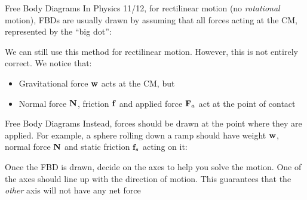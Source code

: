 \documentclass[12pt,compress,aspectratio=169]{beamer}
\newcommand{\mb}[1]{\ensuremath\mathbf{#1}}
\begin{document}
\begin{frame}{Free Body Diagrams}
  In Physics 11/12, for rectilinear motion (no \emph{rotational} motion),
  FBDs are usually drawn by assuming that all forces acting at the CM,
  represented by the ``big dot'':
  \begin{center}
  \end{center}
  \vspace{-.1in}We can still use this method for rectilinear motion. However,
  this is not entirely correct. We notice that:
  \begin{itemize}
  \item Gravitational force $\mb{w}$ acts at the CM, but
  \item Normal force $\mb{N}$, friction $\mb{f}$ and applied force $\mb{F}_a$
    act at the point of contact
  \end{itemize}
\end{frame}



\begin{frame}{Free Body Diagrams}
  Instead, forces should be drawn at the point where they are applied. For
  example, a sphere rolling down a ramp should have weight $\mb{w}$, normal
  force $\mb{N}$ and static friction $\mb{f}_s$ acting on it:
  \begin{center}
  \end{center}
  Once the FBD is drawn, decide on the axes to help you solve the motion. One of
  the axes should line up with the direction of motion. This guarantees that the 
  \emph{other} axis will not have any net force
\end{frame}
\end{document}
